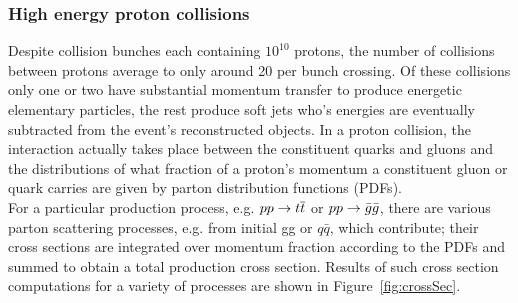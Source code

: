 \FloatBarrier
\subsubsection{High energy proton collisions}
\cite{green2005high}
Despite collision bunches each containing $10^{10}$ protons, the number of collisions
between protons average to only around 20 per bunch crossing. Of these collisions only
one or two have substantial momentum transfer to produce energetic elementary 
particles, the rest produce soft jets who's energies are eventually subtracted from the event's
reconstructed objects. In a proton collision, the interaction actually takes place between the 
constituent quarks and gluons and the distributions of what fraction of a proton's momentum a 
constituent gluon or quark carries are given by parton distribution functions (PDFs). \\
\indent For a particular production process, e.g. $pp \rightarrow \relax{t}\overline{\relax{t}}$ or $pp \rightarrow \bar{g}\bar{g}$, there are 
various parton scattering processes, e.g. from initial gg or $q\bar{q}$, which contribute; their cross sections 
are integrated over momentum fraction according to the PDFs and summed to obtain a total production cross section.
Results of such cross section computations for a variety of processes are shown
in Figure~\ref{fig:crossSec}.

